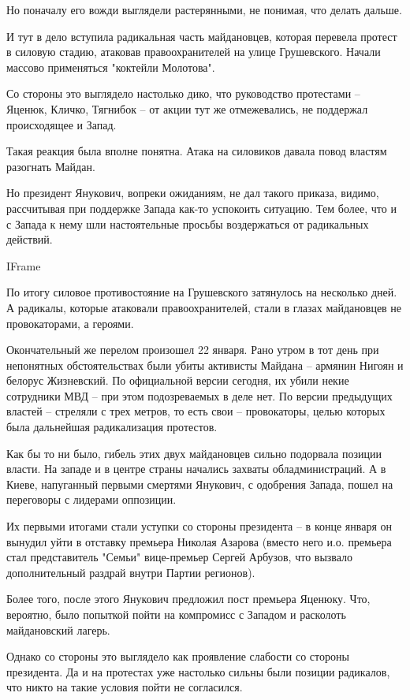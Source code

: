Но поначалу его вожди выглядели растерянными, не понимая, что делать
дальше. 

И тут в дело вступила радикальная часть майдановцев, которая перевела
протест в силовую стадию, атаковав правоохранителей на улице Грушевского.
Начали массово применяться "коктейли Молотова".

Со стороны это выглядело настолько дико, что руководство протестами –
Яценюк, Кличко, Тягнибок – от акции тут же отмежевались, не поддержал
происходящее и Запад.

Такая реакция была вполне понятна. Атака на силовиков давала повод властям
разогнать Майдан. 

Но президент Янукович, вопреки ожиданиям, не дал такого приказа, видимо,
рассчитывая при поддержке Запада как-то успокоить ситуацию. Тем более, что
и с Запада к нему шли настоятельные просьбы воздержаться от радикальных
действий.

IFrame

По итогу силовое противостояние на Грушевского затянулось на несколько
дней. А радикалы, которые атаковали правоохранителей, стали в глазах
майдановцев не провокаторами, а героями.  

Окончательный же перелом произошел 22 января. Рано утром в тот день при
непонятных обстоятельствах были убиты активисты Майдана – армянин Нигоян и
белорус Жизневский. По официальной версии сегодня, их убили некие
сотрудники МВД – при этом подозреваемых в деле нет. По версии предыдущих
властей – стреляли с трех метров, то есть свои – провокаторы, целью
которых была дальнейшая радикализация протестов.

Как бы то ни было, гибель этих двух майдановцев сильно подорвала позиции
власти. На западе и в центре страны начались захваты обладминистраций. А в
Киеве, напуганный первыми смертями Янукович, с одобрения Запада, пошел на
переговоры с лидерами оппозиции. 

Их первыми итогами стали уступки со стороны президента – в конце января он
вынудил уйти в отставку премьера Николая Азарова (вместо него и.о.
премьера стал представитель "Семьи" вице-премьер Сергей Арбузов, что
вызвало дополнительный раздрай внутри Партии регионов). 

Более того, после этого Янукович предложил пост премьера Яценюку. Что,
вероятно, было  попыткой пойти на компромисс с Западом и расколоть
майдановский лагерь.

Однако со стороны это выглядело как проявление слабости со стороны
президента. Да и на протестах уже настолько сильны были позиции радикалов,
что никто на такие условия пойти не согласился. 

